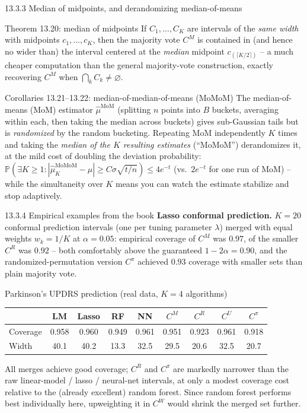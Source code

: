 \documentclass[aspectratio=169,10pt]{beamer}
\newcommand{\Pb}{\mathbb{P}}
\begin{document}
\begin{frame}{13.3.3 Median of midpoints, and derandomizing median-of-means}
  \begin{block}{Theorem 13.20: median of midpoints}
    If $C_1,\dots,C_K$ are intervals of the \emph{same width} with midpoints $c_1,\dots,c_K$, then the majority vote $C^M$ is contained in (and hence no wider than) the interval centered at the \emph{median} midpoint $c_{(\lceil K/2\rceil)}$ -- a much cheaper computation than the general majority-vote construction, exactly recovering $C^M$ when $\bigcap_k C_k\ne\varnothing$.
  \end{block}

  \begin{block}{Corollaries 13.21--13.22: median-of-median-of-means (MoMoM)}
    The median-of-means (MoM) estimator $\hat\mu^{\mathrm{MoM}}$ (splitting $n$ points into $B$ buckets, averaging within each, then taking the median across buckets) gives sub-Gaussian tails but is \emph{randomized} by the random bucketing. Repeating MoM independently $K$ times and taking the \emph{median of the $K$ resulting estimates} (``MoMoM'') derandomizes it, at the mild cost of doubling the deviation probability: $\Pb(\exists K\geq1: |\hat\mu_K^{\mathrm{MoMoM}}-\mu|\geq C\sigma\sqrt{t/n}) \leq 4e^{-t}$ (vs.\ $2e^{-t}$ for one run of MoM) -- while the simultaneity over $K$ means you can watch the estimate stabilize and stop adaptively.
  \end{block}
\end{frame}

\begin{frame}{13.3.4 Empirical examples from the book}
  \textbf{Lasso conformal prediction.} $K=20$ conformal prediction intervals (one per tuning parameter $\lambda$) merged with equal weights $w_k=1/K$ at $\alpha=0.05$: empirical coverage of $C^M$ was $0.97$, of the smaller $C^R$ was $0.92$ -- both comfortably above the guaranteed $1-2\alpha=0.90$, and the randomized-permutation version $C^\pi$ achieved $0.93$ coverage with smaller sets than plain majority vote.

  \begin{block}{Parkinson's UPDRS prediction (real data, $K=4$ algorithms)}
    \begin{center}
    \begin{tabular}{lcccccccc}
      \toprule
      & LM & Lasso & RF & NN & $C^M$ & $C^R$ & $C^U$ & $C^\pi$ \\
      \midrule
      Coverage & 0.958 & 0.960 & 0.949 & 0.961 & 0.951 & 0.923 & 0.961 & 0.918 \\
      Width & 40.1 & 40.2 & 13.3 & 32.5 & 29.5 & 20.6 & 32.5 & 20.7 \\
      \bottomrule
    \end{tabular}
    \end{center}
  \end{block}
  All merges achieve good coverage; $C^R$ and $C^\pi$ are markedly narrower than the raw linear-model / lasso / neural-net intervals, at only a modest coverage cost relative to the (already excellent) random forest. Since random forest performs best individually here, upweighting it in $C^W$ would shrink the merged set further.
\end{frame}
\end{document}
